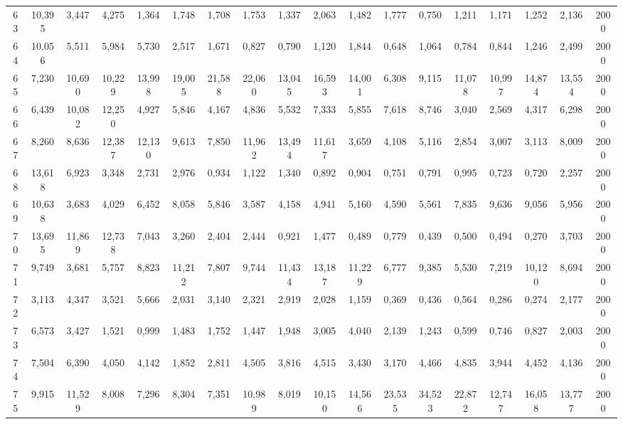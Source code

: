 {\begin{longtable}{ >{\tiny}cccccccccccccccccc}
63  & 10,395 & 3,447  & 4,275  & 1,364  & 1,748  & 1,708  & 1,753  & 1,337  & 2,063  & 1,482  & 1,777  & 0,750   & 1,211   & 1,171   & 1,252   & 2,136   & 2000 \\
64  & 10,056 & 5,511  & 5,984  & 5,730  & 2,517  & 1,671  & 0,827  & 0,790  & 1,120  & 1,844  & 0,648  & 1,064   & 0,784   & 0,844   & 1,246   & 2,499   & 2000 \\
65  & 7,230  & 10,690 & 10,229 & 13,998 & 19,005 & 21,588 & 22,060 & 13,045 & 16,593 & 14,001 & 6,308  & 9,115   & 11,078  & 10,997  & 14,874  & 13,554  & 2000 \\
66  & 6,439  & 10,082 & 12,250 & 4,927  & 5,846  & 4,167  & 4,836  & 5,532  & 7,333  & 5,855  & 7,618  & 8,746   & 3,040   & 2,569   & 4,317   & 6,298   & 2000 \\
67  & 8,260  & 8,636  & 12,387 & 12,130 & 9,613  & 7,850  & 11,962 & 13,494 & 11,617 & 3,659  & 4,108  & 5,116   & 2,854   & 3,007   & 3,113   & 8,009   & 2000 \\
68  & 13,618 & 6,923  & 3,348  & 2,731  & 2,976  & 0,934  & 1,122  & 1,340  & 0,892  & 0,904  & 0,751  & 0,791   & 0,995   & 0,723   & 0,720   & 2,257   & 2000 \\
69  & 10,638 & 3,683  & 4,029  & 6,452  & 8,058  & 5,846  & 3,587  & 4,158  & 4,941  & 5,160  & 4,590  & 5,561   & 7,835   & 9,636   & 9,056   & 5,956   & 2000 \\
70  & 13,695 & 11,869 & 12,738 & 7,043  & 3,260  & 2,404  & 2,444  & 0,921  & 1,477  & 0,489  & 0,779  & 0,439   & 0,500   & 0,494   & 0,270   & 3,703   & 2000 \\
71  & 9,749  & 3,681  & 5,757  & 8,823  & 11,212 & 7,807  & 9,744  & 11,434 & 13,187 & 11,229 & 6,777  & 9,385   & 5,530   & 7,219   & 10,120  & 8,694   & 2000 \\
72  & 3,113  & 4,347  & 3,521  & 5,666  & 2,031  & 3,140  & 2,321  & 2,919  & 2,028  & 1,159  & 0,369  & 0,436   & 0,564   & 0,286   & 0,274   & 2,177   & 2000 \\
73  & 6,573  & 3,427  & 1,521  & 0,999  & 1,483  & 1,752  & 1,447  & 1,948  & 3,005  & 4,040  & 2,139  & 1,243   & 0,599   & 0,746   & 0,827   & 2,003   & 2000 \\
74  & 7,504  & 6,390  & 4,050  & 4,142  & 1,852  & 2,811  & 4,505  & 3,816  & 4,515  & 3,430  & 3,170  & 4,466   & 4,835   & 3,944   & 4,452   & 4,136   & 2000 \\
75  & 9,915  & 11,529 & 8,008  & 7,296  & 8,304  & 7,351  & 10,989 & 8,019  & 10,150 & 14,566 & 23,535 & 34,523  & 22,872  & 12,747  & 16,058  & 13,777  & 2000 \\

\end{longtable}}
